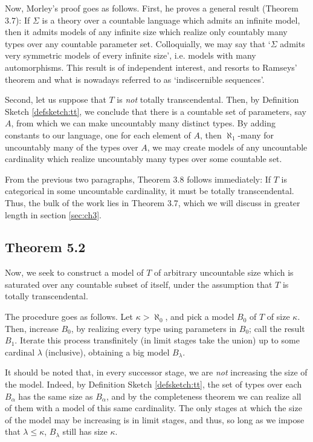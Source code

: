 \documentclass{article}
\theoremstyle{nonumberplain}
\begin{document}
Now, Morley's proof goes as follows. First, he proves a general result (Theorem 3.7): If $\Sigma$ is a theory over a countable language which admits an infinite model, then it admits models of any infinite size which realize only countably many types over any countable parameter set. Colloquially, we may say that `$\Sigma$ admits very symmetric models of every infinite size', i.e. models with many automorphisms. This result is of independent interest, and resorts to Ramseys' theorem and what is nowadays referred to as `indiscernible sequences'.

Second, let us suppose that $T$ is \emph{not} totally transcendental. Then, by Definition Sketch \ref{defsketch:tt}, we conclude that there is a countable set of parameters, say $A$, from which we can make uncountably many distinct types. By adding constants to our language, one for each element of $A$, then $\aleph_1$-many for uncountably many of the types over $A$, we may create models of any uncountable cardinality which realize uncountably many types over some countable set.

From the previous two paragraphs, Theorem 3.8 follows immediately: If $T$ is categorical in some uncountable cardinality, it must be totally transcendental. Thus, the bulk of the work lies in Theorem 3.7, which we will discuss in greater length in section \ref{sec:ch3}.

\subsection{Theorem 5.2}

Now, we seek to construct a model of $T$ of arbitrary uncountable size which is saturated over any countable subset of itself, under the assumption that $T$ is totally transcendental.

The procedure goes as follows. Let $\kappa > \aleph_0$, and pick a model $B_0$ of $T$ of size $\kappa$. Then, increase $B_0$, by realizing every type using parameters in $B_0$; call the result $B_1$. Iterate this process transfinitely (in limit stages take the union) up to some cardinal $\lambda$ (inclusive), obtaining a big model $B_\lambda$.

It should be noted that, in every successor stage, we are \emph{not} increasing the size of the model. Indeed, by Definition Sketch \ref{defsketch:tt}, the set of types over each $B_\alpha$ has the same size as $B_\alpha$, and by the completeness theorem we can realize all of them with a model of this same cardinality. The only stages at which the size of the model may be increasing is in limit stages, and thus, so long as we impose that $\lambda \leq \kappa$, $B_\lambda$ still has size $\kappa$.
\end{document}
